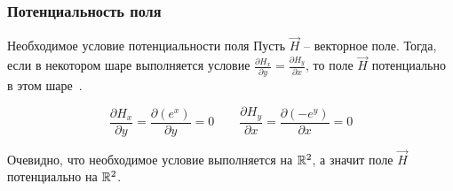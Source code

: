 \begin{frame}\frametitle{Потенциальность поля}
	\begin{block}{Необходимое условие потенциальности поля}
		Пусть \(\vec H\) -- векторное поле.
		Тогда, если в некотором шаре выполняется условие
		\(\frac{\partial H_x}{\partial y} = \frac{\partial H_y}{\partial x}\),
		то поле \(\vec H\) потенциально в этом шаре~\cite[ст.~270,272]{zorich}.
	\end{block}

	\[
		\frac{\partial H_x}{\partial y} = \frac{\partial (e^x)}{\partial y} = 0
		\qquad
		\frac{\partial H_y}{\partial x} = \frac{\partial (-e^y)}{\partial x} = 0
	\]

	Очевидно, что необходимое условие выполняется на \(\mathbb{R}^2\), а значит
	поле \(\vec H\) потенциально на \(\mathbb{R}^2\).

\end{frame}
